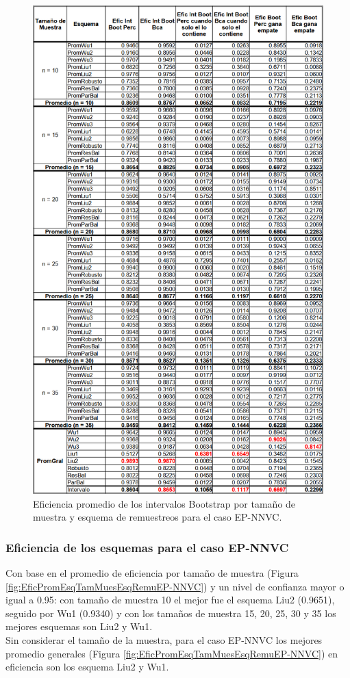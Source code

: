 \begin{figure}[ht] 
	\centering 
	\includegraphics[width=0.55\linewidth]{img/EP_NNVC_Efic_Boots.png} 
	\caption{Eficiencia promedio de los intervalos Bootstrap por tamaño de muestra y esquema de remuestreos para el caso EP-NNVC.} 
	\label{fig:EficPromIntBootsTamMuestEsqRemuEP-NNVC}
\end{figure}
\FloatBarrier


\subsubsection{Eficiencia de los esquemas para el caso EP-NNVC}
Con base en el promedio de eficiencia por tamaño de muestra (Figura \ref{fig:EficPromEsqTamMuesEsqRemuEP-NNVC}) y un nivel de confianza mayor o igual a 0.95: con tamaño de muestra 10 el mejor fue el esquema Liu2 (0.9651), seguido por Wu1 (0.9340) y con los tamaños de muestra 15, 20, 25, 30 y 35 los mejores esquemas son Liu2 y Wu1.\\

Sin considerar el tamaño de la muestra, para el caso EP-NNVC los mejores promedio generales (Figura \ref{fig:EficPromEsqTamMuesEsqRemuEP-NNVC}) en eficiencia son los esquema Liu2 y Wu1.


